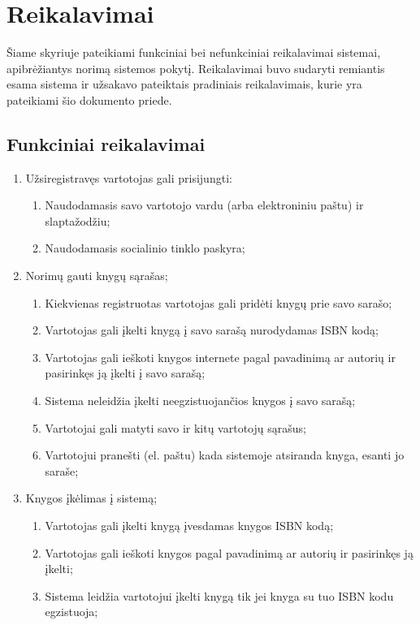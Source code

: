 \documentclass{VUMIFPSkursinis}
\begin{document}
\section{Reikalavimai}
	Šiame skyriuje pateikiami funkciniai bei nefunkciniai reikalavimai sistemai, apibrėžiantys norimą sistemos pokytį.
	Reikalavimai buvo sudaryti remiantis esama sistema ir užsakavo pateiktais pradiniais reikalavimais,
	kurie yra pateikiami šio dokumento priede.
\subsection{Funkciniai reikalavimai}
	\begin{enumerate}[label=\textbf{FR\arabic*}]
		\item Užsiregistravęs vartotojas gali prisijungti:
			\begin{enumerate}[label*=\textbf{.\arabic*}]
				\item Naudodamasis savo vartotojo vardu (arba elektroniniu paštu) ir slaptažodžiu;
				\item Naudodamasis socialinio tinklo paskyra;
			\end{enumerate}
		\item Norimų gauti knygų sąrašas;
			\begin{enumerate}[label*=\textbf{.\arabic*}]
				\item Kiekvienas registruotas vartotojas gali pridėti knygų prie savo sarašo;
				\item Vartotojas gali įkelti knygą į savo sarašą nurodydamas ISBN kodą;
				\item Vartotojas gali ieškoti knygos internete pagal pavadinimą ar autorių ir 
					pasirinkęs ją įkelti į savo sarašą;
				\item Sistema neleidžia įkelti neegzistuojančios knygos į savo sarašą;
				\item Vartotojai gali matyti savo ir kitų vartotojų sąrašus;
				\item Vartotojui pranešti (el. paštu) kada sistemoje atsiranda knyga, esanti jo saraše;
		    \end{enumerate}
		\item Knygos įkėlimas į sistemą;
			\begin{enumerate}[label*=\textbf{.\arabic*}]
				\item Vartotojas gali įkelti knygą įvesdamas knygos ISBN kodą;
				\item Vartotojas gali ieškoti knygos pagal pavadinimą ar autorių ir 
					pasirinkęs ją įkelti;
				\item Sistema leidžia vartotojui įkelti knygą tik jei knyga su tuo ISBN kodu egzistuoja;

\end{enumerate}
\end{enumerate}
\end{document}
